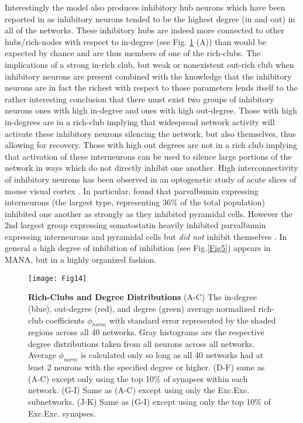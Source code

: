 \documentclass[10pt,letterpaper]{article}
\begin{document}
Interestingly the model also produces inhibitory hub neurons which have been reported in \cite{bonifazi2009gabaergic} as inhibitory neurons tended to be the highest degree (in and out) in all of the networks. These inhibitory hubs are indeed more connected to other hubs/rich-nodes with respect to in-degree (see Fig. \ref{Fig14} (A)) than would be expected by chance and are thus members of one of the rich-clubs. The implications of a strong in-rich club, but weak or nonexistent out-rich club when inhibitory neurons are present combined with the knowledge that the inhibitory neurons are in fact the richest with respect to those parameters lends itself to the rather interesting conclusion that there must exist two groups of inhibitory neurons ones with high in-degree and ones with high out-degree. Those with high in-degrees are in a rich-club implying that widespread network activity will activate these inhibitory neurons silencing the network, but also themselves, thus allowing for recovery. Those with high out degrees are not in a rich club implying that activation of these interneurons can be used to silence large portions of the network in ways which do not directly inhibit one another. High interconnectivity of inhibitory neurons has been observed in an optogenetic study of acute slices of mouse visual cortex \cite{pfeffer2013inhibition}. In particular, \cite{pfeffer2013inhibition} found that parvalbumin expressing interneurons (the largest type, representing 36\% of the total population) inhibited one another as strongly as they inhibited pyramidal cells. However the 2nd largest group expressing somatostatin heavily inhibited parvalbumin expressing interneurons and pyramidal cells but \emph{did not} inhibit themselves \cite{pfeffer2013inhibition}. In general a high degree of inhibition of inhibition (see Fig.\ref{Fig5}) appears in MANA, but in a highly organized fashion.

\begin{figure}[!h]
	\texttt{[image: Fig14]}
	\caption{{\bf Rich-Clubs and Degree Distributions}
		\footnotesize (A-C) The in-degree (blue), out-degree (red), and degree (green) average normalized rich-club coefficients $\phi_{norm}$ with standard error represented by the shaded regions across all 40 networks. Gray histograms are the respective degree distributions taken from all neurons across all networks. Average $\phi_{norm}$ is calculated only so long as all 40 networks had at least 2 neurons with the specified degree or higher. (D-F) same as (A-C) except only using the top 10\% of synapses within each network. (G-I) Same as (A-C) except using only the Exc.\textrightarrow Exc. subnetworks. (J-K) Same as (G-I) except using only the top 10\% of Exc.\textrightarrow Exc. synapses.   }
	\label{Fig14}
\end{figure}
\end{document}
